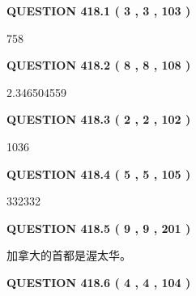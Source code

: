 \documentclass{ctexart}
\begin{document}
{\textbf{\Large{QUESTION
418.1 
 ( 3 , 3 , 103 )
}}}
  
  
 
 
\noindent{}

758
 
 
  
\vspace{0.2in}
  
{\textbf{\Large{QUESTION
418.2 
 ( 8 , 8 , 108 )
}}}
  
  
 
 
\noindent{}

2.346504559
 
 
  
\vspace{0.2in}
  
{\textbf{\Large{QUESTION
418.3 
 ( 2 , 2 , 102 )
}}}
  
  
 
 
\noindent{}

1036
 
 
  
\vspace{0.2in}
  
{\textbf{\Large{QUESTION
418.4 
 ( 5 , 5 , 105 )
}}}
  
  
 
 
\noindent{}

332332
 
 
  
\vspace{0.2in}
  
{\textbf{\Large{QUESTION
418.5 
 ( 9 , 9 , 201 )
}}}
  
  
 
 
\noindent{}
 
 
加拿大的首都是渥太华。
 
 
 
 
  
\vspace{0.2in}
  
{\textbf{\Large{QUESTION
418.6 
 ( 4 , 4 , 104 )
}}}
  
  
 
 
\noindent{}
\end{document}
